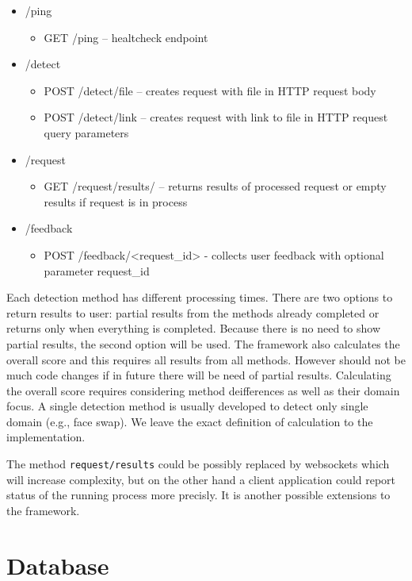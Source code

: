 \begin{itemize}
    \item /ping
    \begin{itemize}
        \item GET /ping – healtcheck endpoint
    \end{itemize}
    \item /detect
    \begin{itemize}
        \item POST /detect/file – creates request with file in HTTP request body
        \item POST /detect/link – creates request with link to file in HTTP request query parameters
    \end{itemize}
    \item /request
    \begin{itemize}
        \item GET /request/results/ – returns results of processed request or empty results if request is in process
    \end{itemize}
    \item /feedback
    \begin{itemize}
        \item POST /feedback/<request\_id> - collects user feedback with optional parameter request\_id
    \end{itemize}
\end{itemize}

Each detection method has different processing times. There are two options to return results to user: partial results from the methods already completed or returns only when everything is completed. Because there is no need to show partial results, the second option will be used. The framework also calculates the overall score and this requires all results from all methods. However should not be much code changes if in future there will be need of partial results. Calculating the overall score requires considering method deifferences as well as their domain focus. A single detection method is usually developed to detect only single domain (e.g., face swap). We leave the exact definition of calculation to the implementation.

The method \texttt{request/results} could be possibly replaced by websockets which will increase complexity, but on the other hand a client application could report status of the running process more precisly. It is another possible extensions to the framework.

\section{Database}

